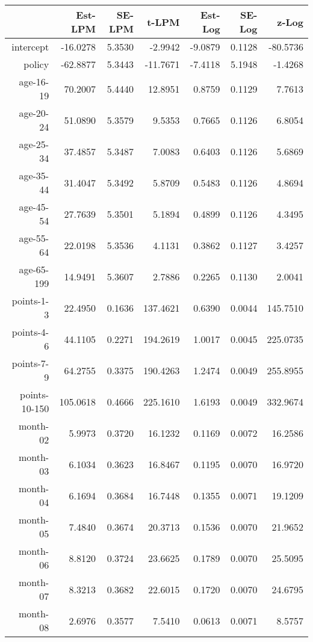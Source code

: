 \documentclass[10pt]{article}
\begin{document}

\begin{table}[ht]
\centering
\begin{tabular}{rrrrrrr}
  \hline
 & Est-LPM & SE-LPM & t-LPM & Est-Log & SE-Log & z-Log \\ 
  \hline
intercept & -16.0278 & 5.3530 & -2.9942 & -9.0879 & 0.1128 & -80.5736 \\ 
  policy & -62.8877 & 5.3443 & -11.7671 & -7.4118 & 5.1948 & -1.4268 \\ 
  age-16-19 & 70.2007 & 5.4440 & 12.8951 & 0.8759 & 0.1129 & 7.7613 \\ 
  age-20-24 & 51.0890 & 5.3579 & 9.5353 & 0.7665 & 0.1126 & 6.8054 \\ 
  age-25-34 & 37.4857 & 5.3487 & 7.0083 & 0.6403 & 0.1126 & 5.6869 \\ 
  age-35-44 & 31.4047 & 5.3492 & 5.8709 & 0.5483 & 0.1126 & 4.8694 \\ 
  age-45-54 & 27.7639 & 5.3501 & 5.1894 & 0.4899 & 0.1126 & 4.3495 \\ 
  age-55-64 & 22.0198 & 5.3536 & 4.1131 & 0.3862 & 0.1127 & 3.4257 \\ 
  age-65-199 & 14.9491 & 5.3607 & 2.7886 & 0.2265 & 0.1130 & 2.0041 \\ 
  points-1-3 & 22.4950 & 0.1636 & 137.4621 & 0.6390 & 0.0044 & 145.7510 \\ 
  points-4-6 & 44.1105 & 0.2271 & 194.2619 & 1.0017 & 0.0045 & 225.0735 \\ 
  points-7-9 & 64.2755 & 0.3375 & 190.4263 & 1.2474 & 0.0049 & 255.8955 \\ 
  points-10-150 & 105.0618 & 0.4666 & 225.1610 & 1.6193 & 0.0049 & 332.9674 \\ 
  month-02 & 5.9973 & 0.3720 & 16.1232 & 0.1169 & 0.0072 & 16.2586 \\ 
  month-03 & 6.1034 & 0.3623 & 16.8467 & 0.1195 & 0.0070 & 16.9720 \\ 
  month-04 & 6.1694 & 0.3684 & 16.7448 & 0.1355 & 0.0071 & 19.1209 \\ 
  month-05 & 7.4840 & 0.3674 & 20.3713 & 0.1536 & 0.0070 & 21.9652 \\ 
  month-06 & 8.8120 & 0.3724 & 23.6625 & 0.1789 & 0.0070 & 25.5095 \\ 
  month-07 & 8.3213 & 0.3682 & 22.6015 & 0.1720 & 0.0070 & 24.6795 \\ 
  month-08 & 2.6976 & 0.3577 & 7.5410 & 0.0613 & 0.0071 & 8.5757 \\ 

\end{tabular}
\end{table}
\end{document}
